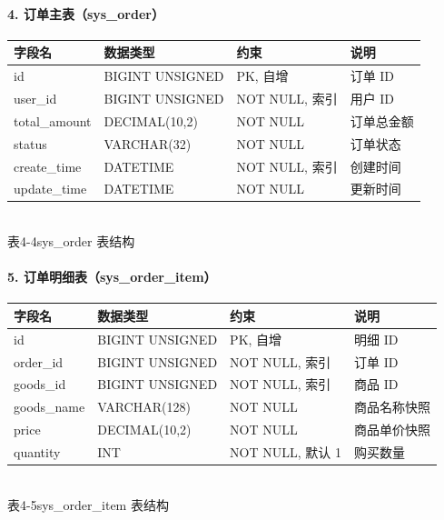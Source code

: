 \paragraph{4. 订单主表（sys\_order）}
\begin{center}
  \renewcommand{\arraystretch}{1.4}
  \begin{tabular}{|>{\centering\arraybackslash}m{2.5cm}|>{\centering\arraybackslash}m{3.2cm}|>{\centering\arraybackslash}m{4.4cm}|>{\centering\arraybackslash}m{3.5cm}|}
    \hline
    \textbf{字段名}  & \textbf{数据类型}   & \textbf{约束}  & \textbf{说明} \\ \hline
    id            & BIGINT UNSIGNED & PK, 自增       & 订单 ID       \\ \hline
    user\_id      & BIGINT UNSIGNED & NOT NULL, 索引 & 用户 ID       \\ \hline
    total\_amount & DECIMAL(10,2)   & NOT NULL     & 订单总金额       \\ \hline
    status        & VARCHAR(32)     & NOT NULL     & 订单状态        \\ \hline
    create\_time  & DATETIME        & NOT NULL, 索引 & 创建时间        \\ \hline
    update\_time  & DATETIME        & NOT NULL     & 更新时间        \\ \hline
  \end{tabular}
  \\[0.3em]
  {表4-4\quad sys\_order 表结构}
\end{center}

\paragraph{5. 订单明细表（sys\_order\_item）}
\begin{center}
  \renewcommand{\arraystretch}{1.4}
  \begin{tabular}{|>{\centering\arraybackslash}m{2.5cm}|>{\centering\arraybackslash}m{3.2cm}|>{\centering\arraybackslash}m{4.4cm}|>{\centering\arraybackslash}m{3.5cm}|}
    \hline
    \textbf{字段名} & \textbf{数据类型}   & \textbf{约束}    & \textbf{说明} \\ \hline
    id           & BIGINT UNSIGNED & PK, 自增         & 明细 ID       \\ \hline
    order\_id    & BIGINT UNSIGNED & NOT NULL, 索引   & 订单 ID       \\ \hline
    goods\_id    & BIGINT UNSIGNED & NOT NULL, 索引   & 商品 ID       \\ \hline
    goods\_name  & VARCHAR(128)    & NOT NULL       & 商品名称快照      \\ \hline
    price        & DECIMAL(10,2)   & NOT NULL       & 商品单价快照      \\ \hline
    quantity     & INT             & NOT NULL, 默认 1 & 购买数量        \\ \hline
  \end{tabular}
  \\[0.3em]
  {表4-5\quad sys\_order\_item 表结构}
\end{center}

